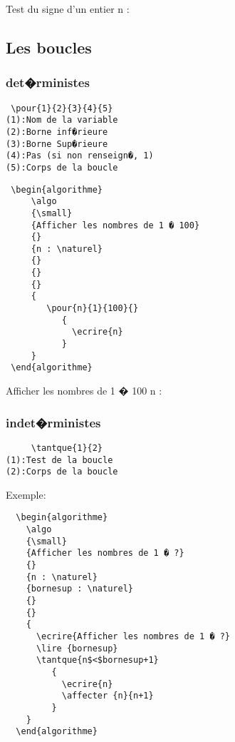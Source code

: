 \documentclass[a4paper,12pt]{report}
\begin{document}
 \begin{algorithme}
    \algo
        {\small}
        {Test du signe d'un entier}
        {}
        {n : \entier}
        {}
        {}
        {}
        {
             {
             }
             {
             }
       }
 \end{algorithme}


 \subsection{Les boucles}
 \subsubsection{det�rministes}

 \begin{lstlisting}
 \pour{1}{2}{3}{4}{5}
(1):Nom de la variable
(2):Borne inf�rieure
(3):Borne Sup�rieure
(4):Pas (si non renseign�, 1)
(5):Corps de la boucle
 \end{lstlisting}


 \begin{lstlisting}
 \begin{algorithme}
     \algo 
     {\small}
     {Afficher les nombres de 1 � 100}
     {}
     {n : \naturel}
     {}
     {}
     {}
     {
        \pour{n}{1}{100}{}
           {
             \ecrire{n}
           }
     }
 \end{algorithme}

 \end{lstlisting}

 \begin{algorithme}
     \algo 
     {\small}
     {Afficher les nombres de 1 � 100}
     {}
     {n : \naturel}
     {}
     {}
     {}
     {
           {
           }
     }
 \end{algorithme}

 \subsubsection{indet�rministes}
   \begin{lstlisting}
     \tantque{1}{2}
(1):Test de la boucle
(2):Corps de la boucle
   \end{lstlisting}

Exemple:
\begin{lstlisting}
  \begin{algorithme}
    \algo
    {\small}
    {Afficher les nombres de 1 � ?}
    {}
    {n : \naturel}
    {bornesup : \naturel}
    {}
    {}
    {
      \ecrire{Afficher les nombres de 1 � ?}
      \lire {bornesup}
      \tantque{n$<$bornesup+1}
         {
           \ecrire{n}
           \affecter {n}{n+1}
         }
    }
  \end{algorithme}
\end{lstlisting}
\end{document}
